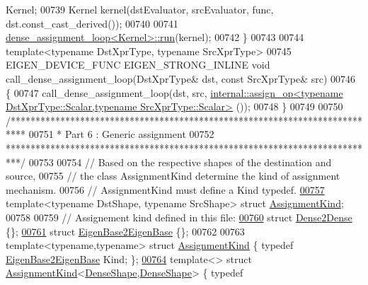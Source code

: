 \begin{DoxyCode}
       Kernel;
00739   Kernel kernel(dstEvaluator, srcEvaluator, func, dst.const\_cast\_derived());
00740 
00741   \hyperlink{struct_eigen_1_1internal_1_1dense__assignment__loop}{dense\_assignment\_loop<Kernel>::run}(kernel);
00742 \}
00743 
00744 \textcolor{keyword}{template}<\textcolor{keyword}{typename} DstXprType, \textcolor{keyword}{typename} SrcXprType>
00745 EIGEN\_DEVICE\_FUNC EIGEN\_STRONG\_INLINE \textcolor{keywordtype}{void} call\_dense\_assignment\_loop(DstXprType& dst, \textcolor{keyword}{const} SrcXprType& 
      src)
00746 \{
00747   call\_dense\_assignment\_loop(dst, src, 
      \hyperlink{struct_eigen_1_1internal_1_1assign__op}{internal::assign\_op<typename DstXprType::Scalar,typename SrcXprType::Scalar>}
      ());
00748 \}
00749 
00750 \textcolor{comment}{/***************************************************************************}
00751 \textcolor{comment}{* Part 6 : Generic assignment}
00752 \textcolor{comment}{***************************************************************************/}
00753 
00754 \textcolor{comment}{// Based on the respective shapes of the destination and source,}
00755 \textcolor{comment}{// the class AssignmentKind determine the kind of assignment mechanism.}
00756 \textcolor{comment}{// AssignmentKind must define a Kind typedef.}
\hyperlink{struct_eigen_1_1internal_1_1_assignment_kind}{00757} \textcolor{keyword}{template}<\textcolor{keyword}{typename} DstShape, \textcolor{keyword}{typename} SrcShape> \textcolor{keyword}{struct }\hyperlink{struct_eigen_1_1internal_1_1_assignment_kind}{AssignmentKind};
00758 
00759 \textcolor{comment}{// Assignement kind defined in this file:}
\hyperlink{struct_eigen_1_1internal_1_1_dense2_dense}{00760} \textcolor{keyword}{struct }\hyperlink{struct_eigen_1_1internal_1_1_dense2_dense}{Dense2Dense} \{\};
\hyperlink{struct_eigen_1_1internal_1_1_eigen_base2_eigen_base}{00761} \textcolor{keyword}{struct }\hyperlink{struct_eigen_1_1internal_1_1_eigen_base2_eigen_base}{EigenBase2EigenBase} \{\};
00762 
00763 \textcolor{keyword}{template}<\textcolor{keyword}{typename},\textcolor{keyword}{typename}> \textcolor{keyword}{struct }\hyperlink{struct_eigen_1_1internal_1_1_assignment_kind}{AssignmentKind} \{ \textcolor{keyword}{typedef} 
      \hyperlink{struct_eigen_1_1internal_1_1_eigen_base2_eigen_base}{EigenBase2EigenBase} Kind; \};
\hyperlink{struct_eigen_1_1internal_1_1_assignment_kind_3_01_dense_shape_00_01_dense_shape_01_4}{00764} \textcolor{keyword}{template}<> \textcolor{keyword}{struct }\hyperlink{struct_eigen_1_1internal_1_1_assignment_kind}{AssignmentKind}<\hyperlink{struct_eigen_1_1_dense_shape}{DenseShape},\hyperlink{struct_eigen_1_1_dense_shape}{DenseShape}> \{ \textcolor{keyword}{typedef} 

\end{DoxyCode}
